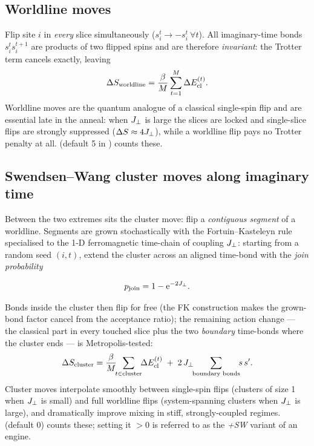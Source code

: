 \subsection{Worldline moves}

Flip site $i$ in \emph{every} slice simultaneously
($s^t_i\to-s^t_i\ \forall t$). All imaginary-time bonds
$s^t_is^{t+1}_i$ are products of two flipped spins and are therefore
\emph{invariant}: the Trotter term cancels exactly, leaving
\begin{equation}
\Delta S_{\text{worldline}}=\frac{\beta}{M}\sum_{t=1}^{M}\Delta E_{\mathrm{cl}}^{(t)} .
\label{eq:worldline}
\end{equation}
Worldline moves are the quantum analogue of a classical single-spin flip and
are essential late in the anneal: when $J_{\perp}$ is large the slices are locked
and single-slice flips are strongly suppressed
($\Delta S\approx4J_{\perp}$), while a worldline flip pays no Trotter penalty at
all.  (default 5 in ) counts these.

\subsection{Swendsen--Wang cluster moves along imaginary time}
\label{sec:sw-moves}

Between the two extremes sits the cluster move: flip a \emph{contiguous
segment} of a worldline. Segments are grown stochastically with the
Fortuin--Kasteleyn rule specialised to the 1-D ferromagnetic time-chain of
coupling $J_{\perp}$: starting from a random seed $(i,t)$, extend the cluster
across an aligned time-bond with the \emph{join probability}

\begin{keyeq}
\begin{equation}
p_{\text{join}}=1-\mathrm{e}^{-2J_{\perp}}.
\label{eq:joinprob}
\end{equation}
\end{keyeq}

Bonds inside the cluster then flip for free (the FK construction makes the
grown-bond factor cancel from the acceptance ratio); the remaining action
change --- the classical part in every touched slice plus the two
\emph{boundary} time-bonds where the cluster ends --- is Metropolis-tested:
\begin{equation}
\Delta S_{\text{cluster}}
=\frac{\beta}{M}\!\!\sum_{t\in\text{cluster}}\!\!\Delta\Ecl^{(t)}
\;+\;2\,\Jp\!\!\sum_{\text{boundary bonds}}\!\! s\,s' .
\end{equation}
Cluster moves interpolate smoothly between single-spin flips (clusters of
size 1 when $J_{\perp}$ is small) and full worldline flips (system-spanning
clusters when $J_{\perp}$ is large), and dramatically improve mixing in stiff,
strongly-coupled regimes.  (default 0) counts these;
setting it $>0$ is referred to as the \emph{+SW} variant of an engine.


